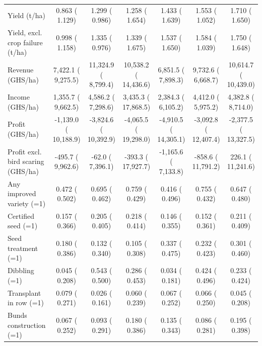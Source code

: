 \begin{tabular}{lcccccc}
Yield (t/ha) &     0.863 (    1.129) &     1.299 (    0.986) &     1.258 (    1.654) &     1.433 (    1.639) &     1.553 (    1.052) &     1.710 (    1.650) \\
\quad Yield, excl. crop failure (t/ha) &     0.998 (    1.158) &     1.335 (    0.976) &     1.339 (    1.675) &     1.537 (    1.650) &     1.584 (    1.039) &     1.750 (    1.648) \\
Revenue (GHS/ha) &      7,422.1 (     9,275.5) &     11,324.9 (     8,799.4) &     10,538.2 (    14,436.6) &      6,851.5 (     7,898.3) &      9,732.6 (     6,668.7) &     10,614.7 (    10,439.0) \\
Income (GHS/ha) &      1,355.7 (     9,662.5) &      4,586.2 (     7,298.6)\sym{*} &      3,435.3 (    17,868.5) &      2,384.3 (     6,105.2) &      4,412.0 (     5,975.2) &      4,382.8 (     8,714.0) \\
Profit (GHS/ha) &     -1,139.0 (    10,188.9) &     -3,824.6 (    10,392.9) &     -4,065.5 (    19,298.0) &     -4,910.5 (    14,305.1) &     -3,092.8 (    12,407.4) &     -2,377.5 (    13,327.5) \\
Profit excl. bird scaring (GHS/ha) &       -495.7 (     9,962.6) &        -62.0 (     7,396.1) &       -393.3 (    17,927.7) &     -1,165.6 (     7,133.8) &       -858.6 (    11,791.2) &        226.1 (    11,241.6) \\
Any improved variety (=1) &     0.472 (    0.502) &     0.695 (    0.462) &     0.759 (    0.429) &     0.416 (    0.496) &     0.755 (    0.432) &     0.647 (    0.480) \\
Certified seed (=1) &     0.157 (    0.366) &     0.205 (    0.405) &     0.218 (    0.414) &     0.146 (    0.355) &     0.152 (    0.361) &     0.211 (    0.409) \\
Seed treatment (=1) &     0.180 (    0.386) &     0.132 (    0.340) &     0.105 (    0.308) &     0.337 (    0.475) &     0.232 (    0.423) &     0.301 (    0.460) \\
Dibbling (=1) &     0.045 (    0.208) &     0.543 (    0.500)\sym{*} &     0.286 (    0.453) &     0.034 (    0.181) &     0.424 (    0.496)\sym{*} &     0.233 (    0.424) \\
Transplant in row (=1) &     0.079 (    0.271) &     0.026 (    0.161) &     0.060 (    0.239) &     0.067 (    0.252) &     0.066 (    0.250) &     0.045 (    0.208) \\
Bunds construction (=1) &     0.067 (    0.252) &     0.093 (    0.291) &     0.180 (    0.386) &     0.135 (    0.343) &     0.086 (    0.281) &     0.195 (    0.398) \\

\end{tabular}

